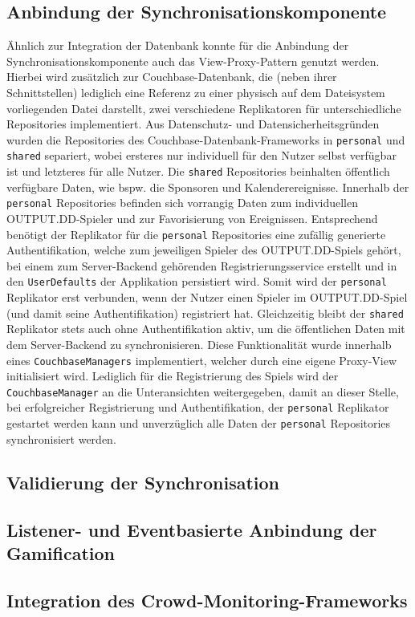\subsection{Anbindung der Synchronisationskomponente}

Ähnlich zur Integration der Datenbank konnte für die Anbindung der Synchronisationskomponente auch das View-Proxy-Pattern genutzt werden. Hierbei wird zusätzlich zur Couchbase-Datenbank, die (neben ihrer Schnittstellen) lediglich eine Referenz zu einer physisch auf dem Dateisystem vorliegenden Datei darstellt, zwei verschiedene Replikatoren für unterschiedliche Repositories implementiert. Aus Datenschutz- und Datensicherheitsgründen wurden die Repositories des Couchbase-Datenbank-Frameworks in \texttt{personal} und \texttt{shared} separiert, wobei ersteres nur individuell für den Nutzer selbst verfügbar ist und letzteres für alle Nutzer. Die \texttt{shared} Repositories beinhalten öffentlich verfügbare Daten, wie bspw. die Sponsoren und Kalenderereignisse. Innerhalb der \texttt{personal} Repositories befinden sich vorrangig Daten zum individuellen OUTPUT.DD-Spieler und zur Favorisierung von Ereignissen. Entsprechend benötigt der Replikator für die \texttt{personal} Repositories eine zufällig generierte Authentifikation, welche zum jeweiligen Spieler des OUTPUT.DD-Spiels gehört, bei einem zum Server-Backend gehörenden Registrierungsservice erstellt und in den \texttt{UserDefaults} der Applikation persistiert wird. Somit wird der \texttt{personal} Replikator erst verbunden, wenn der Nutzer einen Spieler im OUTPUT.DD-Spiel (und damit seine Authentifikation) registriert hat. Gleichzeitig bleibt der \texttt{shared} Replikator stets auch ohne Authentifikation aktiv, um die öffentlichen Daten mit dem Server-Backend zu synchronisieren. Diese Funktionalität wurde innerhalb eines \texttt{CouchbaseManagers} implementiert, welcher durch eine eigene Proxy-View initialisiert wird. Lediglich für die Registrierung des Spiels wird der \texttt{CouchbaseManager} an die Unteransichten weitergegeben, damit an dieser Stelle, bei erfolgreicher Registrierung und Authentifikation, der \texttt{personal} Replikator gestartet werden kann und unverzüglich alle Daten der \texttt{personal} Repositories synchronisiert werden.

\subsection{Validierung der Synchronisation}



\subsection{Listener- und Eventbasierte Anbindung der Gamification}

\subsection{Integration des Crowd-Monitoring-Frameworks}
